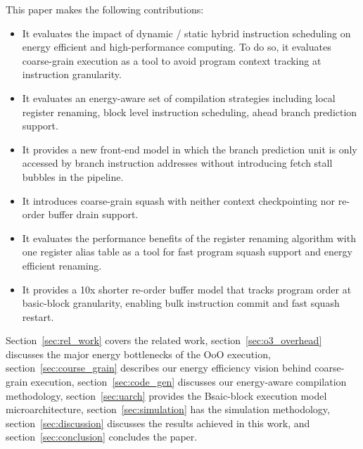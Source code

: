 This paper makes the following contributions:
\begin{itemize}
    \item It evaluates the impact of dynamic / static hybrid instruction
    scheduling on energy efficient and high-performance computing. To do so, it
    evaluates coarse-grain execution as a tool to avoid program context tracking
    at instruction granularity.
    \item It evaluates an energy-aware set of compilation strategies including
    local register renaming, block level instruction scheduling, ahead branch
    prediction support.
    \item It provides a new front-end model in which the branch prediction unit
    is only accessed by branch instruction addresses without introducing fetch
    stall bubbles in the pipeline.
    \item It introduces coarse-grain squash with neither context checkpointing
    nor re-order buffer drain support.
    \item It evaluates the performance benefits of the register renaming
    algorithm with one register alias table as a tool for fast program squash
    support and energy efficient renaming.
    \item It provides a 10x shorter re-order buffer model that tracks program
    order at basic-block granularity, enabling bulk instruction commit and fast
    squash restart.
\end{itemize}

Section~\ref{sec:rel_work} covers the related work,
    section~\ref{sec:o3_overhead} discusses the major energy bottlenecks of the
    OoO execution, section~\ref{sec:course_grain} describes our energy
    efficiency vision behind coarse-grain execution, section~\ref{sec:code_gen}
    discusses our energy-aware compilation methodology, section~\ref{sec:uarch}
    provides the Bsaic-block execution model microarchitecture,
    section~\ref{sec:simulation} has the simulation methodology,
    section~\ref{sec:discussion} discusses the results achieved in this work,
    and section~\ref{sec:conclusion} concludes the paper.
